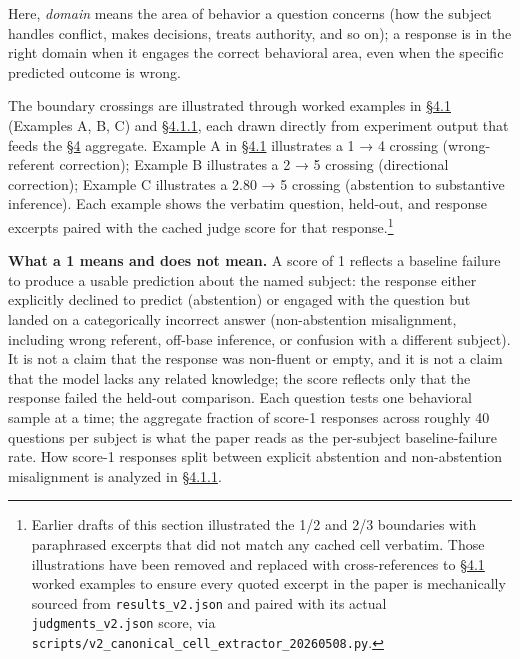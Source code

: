 Here, \emph{domain} means the area of behavior a question concerns (how
the subject handles conflict, makes decisions, treats authority, and so
on); a response is in the right domain when it engages the correct
behavioral area, even when the specific predicted outcome is wrong.

The boundary crossings are illustrated through worked examples in \hyperref[the-cross-subject-gradient-and-its-per-question-mechanism]{§4.1}
(Examples A, B, C) and \hyperref[per-question-baseline-engagement-and-the-worked-rubric-example]{§4.1.1}, each drawn directly from experiment
output that feeds the \hyperref[results]{§4} aggregate. Example A in \hyperref[the-cross-subject-gradient-and-its-per-question-mechanism]{§4.1} illustrates a 1 →
4 crossing (wrong-referent correction); Example B illustrates a 2 → 5
crossing (directional correction); Example C illustrates a 2.80 → 5
crossing (abstention to substantive inference). Each example shows the
verbatim question, held-out, and response excerpts paired with the
cached judge score for that response.\footnote{Earlier drafts of this
  section illustrated the 1/2 and 2/3 boundaries with paraphrased
  excerpts that did not match any cached cell verbatim. Those
  illustrations have been removed and replaced with cross-references to
  \hyperref[the-cross-subject-gradient-and-its-per-question-mechanism]{§4.1} worked examples to ensure every quoted excerpt in the paper is
  mechanically sourced from \texttt{results\_v2.json} and paired with
  its actual \texttt{judgments\_v2.json} score, via
  \texttt{scripts/v2\_canonical\_cell\_extractor\_20260508.py}.}

\textbf{What a 1 means and does not mean.} A score of 1 reflects a
baseline failure to produce a usable prediction about the named subject:
the response either explicitly declined to predict (abstention) or
engaged with the question but landed on a categorically incorrect answer
(non-abstention misalignment, including wrong referent, off-base
inference, or confusion with a different subject). It is not a claim
that the response was non-fluent or empty, and it is not a claim that
the model lacks any related knowledge; the score reflects only that the
response failed the held-out comparison. Each question tests one
behavioral sample at a time; the aggregate fraction of score-1 responses
across roughly 40 questions per subject is what the paper reads as the
per-subject baseline-failure rate. How score-1 responses split between
explicit abstention and non-abstention misalignment is analyzed in
\hyperref[per-question-baseline-engagement-and-the-worked-rubric-example]{§4.1.1}.

